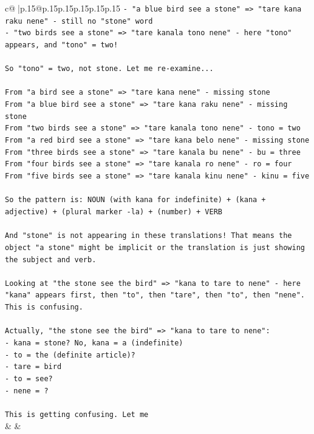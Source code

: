 \documentclass{article}
\begin{document}
{\begin{supertabular}{c@{$\;$}|p{.15\linewidth}@{}p{.15\linewidth}p{.15\linewidth}p{.15\linewidth}p{.15\linewidth}p{.15\linewidth}}
{{{\texttt{{-} "a blue bird see a stone" => "tare kana raku nene" {-} still no "stone" word} \\
\texttt{{-} "two birds see a stone" => "tare kanala tono nene" {-} here "tono" appears, and "tono" = two!} \\
\\ 
\texttt{So "tono" = two, not stone. Let me re{-}examine...} \\
\\ 
\texttt{From "a bird see a stone" => "tare kana nene" {-} missing stone} \\
\texttt{From "a blue bird see a stone" => "tare kana raku nene" {-} missing stone} \\
\texttt{From "two birds see a stone" => "tare kanala tono nene" {-} tono = two} \\
\texttt{From "a red bird see a stone" => "tare kana belo nene" {-} missing stone} \\
\texttt{From "three birds see a stone" => "tare kanala bu nene" {-} bu = three} \\
\texttt{From "four birds see a stone" => "tare kanala ro nene" {-} ro = four} \\
\texttt{From "five birds see a stone" => "tare kanala kinu nene" {-} kinu = five} \\
\\ 
\texttt{So the pattern is: NOUN (with kana for indefinite) + (kana + adjective) + (plural marker {-}la) + (number) + VERB} \\
\\ 
\texttt{And "stone" is not appearing in these translations! That means the object "a stone" might be implicit or the translation is just showing the subject and verb.} \\
\\ 
\texttt{Looking at "the stone see the bird" => "kana to tare to nene" {-} here "kana" appears first, then "to", then "tare", then "to", then "nene". This is confusing.} \\
\\ 
\texttt{Actually, "the stone see the bird" => "kana to tare to nene":} \\
\texttt{{-} kana = stone? No, kana = a (indefinite)} \\
\texttt{{-} to = the (definite article)?} \\
\texttt{{-} tare = bird} \\
\texttt{{-} to = see?} \\
\texttt{{-} nene = ?} \\
\\ 
\texttt{This is getting confusing. Let me} \\
            }
        }
    }
    & & \\ \\


\end{supertabular}}
\end{document}
